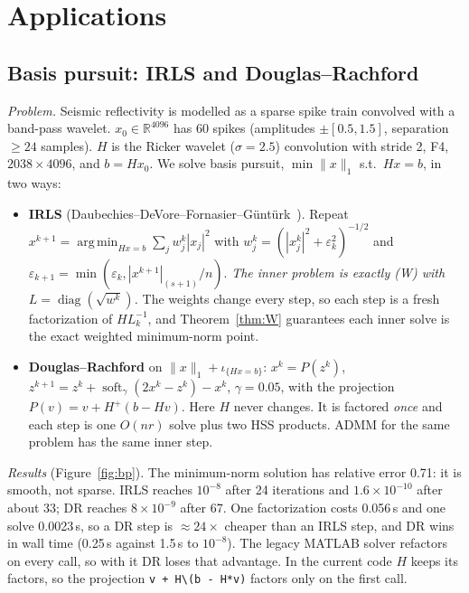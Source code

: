 \section{Applications}\label{sec:apps}

\subsection{Basis pursuit: IRLS and Douglas--Rachford}\label{subsec:bp}
\emph{Problem.} Seismic reflectivity is modelled as a sparse spike train convolved with a band-pass
wavelet. $x_0\in\mathbb{R}^{4096}$ has 60 spikes (amplitudes $\pm[0.5,1.5]$, separation $\ge24$ samples).
$H$ is the Ricker wavelet ($\sigma=2.5$) convolution with stride 2, F4, $2038\times4096$, and
$b=Hx_0$. We solve basis pursuit, $\min\|x\|_1$ s.t.\ $Hx=b$, in two ways:
\begin{itemize}[leftmargin=1.4em,itemsep=1pt]
\item \textbf{IRLS} (Daubechies--DeVore--Fornasier--G\"unt\"urk~\cite{ddfg}). Repeat
$x^{k+1}=\operatorname*{arg\,min}_{Hx=b}\sum_jw_j^k|x_j|^2$ with $w_j^k=(|x_j^k|^2+\varepsilon_k^2)^{-1/2}$ and
$\varepsilon_{k+1}=\min(\varepsilon_k,|x^{k+1}|_{(s+1)}/n)$. \emph{The inner problem is exactly (W) with
$L=\operatorname{diag}(\sqrt{w^k})$.} The weights change every step, so each step is a fresh
factorization of $HL_k^{-1}$, and Theorem~\ref{thm:W} guarantees each inner solve is the exact
weighted minimum-norm point.
\item \textbf{Douglas--Rachford} on $\|x\|_1+\iota_{\{Hx=b\}}$:
$x^k=P(z^k)$, $z^{k+1}=z^k+\operatorname{soft}_\gamma(2x^k-z^k)-x^k$, $\gamma=0.05$, with the projection
$P(v)=v+H^+(b-Hv)$. Here $H$ never changes. It is factored \emph{once} and each step is one $O(nr)$
solve plus two HSS products. ADMM for the same problem has the same inner step.
\end{itemize}
\emph{Results} (Figure~\ref{fig:bp}). The minimum-norm solution has relative error 0.71: it is smooth,
not sparse. IRLS reaches $10^{-8}$ after 24 iterations and $1.6\times10^{-10}$ after about 33; DR reaches $8\times10^{-9}$ after 67.
One factorization costs 0.056\,s and one solve 0.0023\,s, so a DR step is $\approx24\times$ cheaper than
an IRLS step, and DR wins in wall time (0.25\,s against 1.5\,s to $10^{-8}$). The legacy MATLAB solver
refactors on every call, so with it DR loses that advantage. In the current code $H$ keeps its factors,
so the projection \texttt{v + H\textbackslash(b - H*v)} factors only on the first call.

